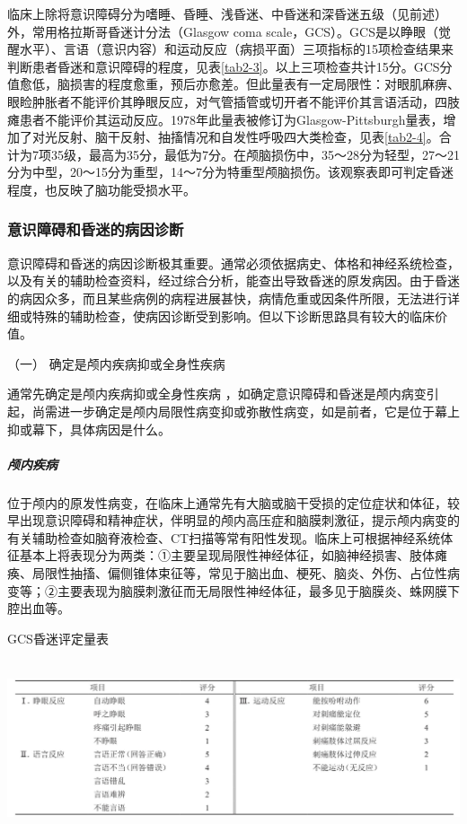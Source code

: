 临床上除将意识障碍分为嗜睡、昏睡、浅昏迷、中昏迷和深昏迷五级（见前述）外，常用格拉斯哥昏迷计分法（Glasgow
coma
scale，GCS）。GCS是以睁眼（觉醒水平）、言语（意识内容）和运动反应（病损平面）三项指标的15项检查结果来判断患者昏迷和意识障碍的程度，见表\ref{tab2-3}。以上三项检查共计15分。GCS分值愈低，脑损害的程度愈重，预后亦愈差。但此量表有一定局限性：对眼肌麻痹、眼睑肿胀者不能评价其睁眼反应，对气管插管或切开者不能评价其言语活动，四肢瘫患者不能评价其运动反应。1978年此量表被修订为Glasgow-Pittsburgh量表，增加了对光反射、脑干反射、抽搐情况和自发性呼吸四大类检查，见表\ref{tab2-4}。合计为7项35级，最高为35分，最低为7分。在颅脑损伤中，35～28分为轻型，27～21分为中型，20～15分为重型，14～7分为特重型颅脑损伤。该观察表即可判定昏迷程度，也反映了脑功能受损水平。

\subsubsection{意识障碍和昏迷的病因诊断}

意识障碍和昏迷的病因诊断极其重要。通常必须依据病史、体格和神经系统检查，以及有关的辅助检查资料，经过综合分析，能查出导致昏迷的原发病因。由于昏迷的病因众多，而且某些病例的病程进展甚快，病情危重或因条件所限，无法进行详细或特殊的辅助检查，使病因诊断受到影响。但以下诊断思路具有较大的临床价值。

\hypertarget{text00010.htmlux5cux23CHP1-2-2-4-1}{}
（一） 确定是颅内疾病抑或全身性疾病

通常先确定是颅内疾病抑或全身性疾病
，如确定意识障碍和昏迷是颅内病变引起，尚需进一步确定是颅内局限性病变抑或弥散性病变，如是前者，它是位于幕上抑或幕下，具体病因是什么。

\subparagraph{颅内疾病}

位于颅内的原发性病变，在临床上通常先有大脑或脑干受损的定位症状和体征，较早出现意识障碍和精神症状，伴明显的颅内高压症和脑膜刺激征，提示颅内病变的有关辅助检查如脑脊液检查、CT扫描等常有阳性发现。临床上可根据神经系统体征基本上将表现分为两类：①主要呈现局限性神经体征，如脑神经损害、肢体瘫痪、局限性抽搐、偏侧锥体束征等，常见于脑出血、梗死、脑炎、外伤、占位性病变等；②主要表现为脑膜刺激征而无局限性神经体征，最多见于脑膜炎、蛛网膜下腔出血等。

\begin{table}[htbp]
\centering
\caption{GCS昏迷评定量表}
\label{tab2-3}
\includegraphics[width=6.66667in,height=2.03125in]{./images/Image00006.jpg}
\end{table}

